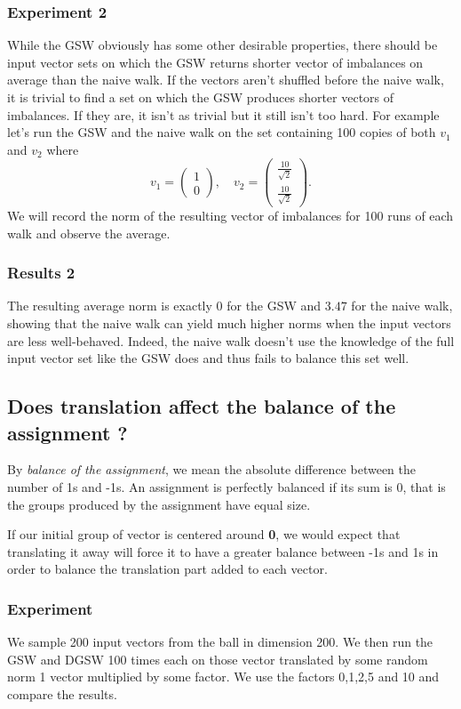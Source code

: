 \documentclass[12pt]{article}
\begin{document}
\subsubsection{Experiment 2}
While the GSW obviously has some other desirable properties, there should be input vector sets on which the GSW returns shorter vector of imbalances on average than the naive walk. If the vectors aren't shuffled before the naive walk, it is trivial to find a set on which the GSW produces shorter vectors of imbalances. If they are, it isn't as trivial but it still isn't too hard. For example let's run the GSW and the naive walk on the set containing 100 copies of both $v_1$ and $v_2$ where $$v_1=\begin{pmatrix}1\\0\end{pmatrix},\quad v_2=\begin{pmatrix}\frac{10}{\sqrt{2}}\\ \frac{10}{\sqrt{2}}\end{pmatrix}.$$
We will record the norm of the resulting vector of imbalances for 100 runs of each walk and observe the average.
\subsubsection{Results 2}
The resulting average norm is exactly $0$ for the GSW and $3.47$ for the naive walk, showing that the naive walk can yield much higher norms when the input vectors are less well-behaved. Indeed, the naive walk doesn't use the knowledge of the full input vector set like the GSW does and thus fails to balance this set well.

\subsection{Does translation affect the balance of the assignment ?}\label{trans_balance}
By \textit{balance of the assignment}, we mean the absolute difference between the number of 1s and -1s. An assignment is perfectly balanced if its sum is 0, that is the groups produced by the assignment have equal size.

If our initial group of vector is centered around \textbf{0}, we would expect that translating it away will force it to have a greater balance between -1s and 1s in order to balance the translation part added to each vector.

\subsubsection{Experiment}
We sample 200 input vectors from the ball in dimension 200. We then run the GSW and DGSW 100 times each on those vector translated by some random norm 1 vector multiplied by some factor. We use the factors 0,1,2,5 and 10 and compare the results.
\end{document}
